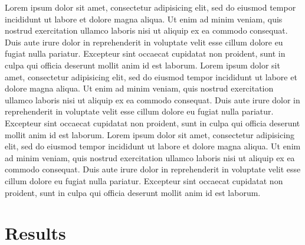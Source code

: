 \documentclass[a0,landscape]{a0poster}
\begin{document}
\begin{multicols}{3}
Lorem ipsum dolor sit amet, consectetur adipisicing elit, sed do eiusmod
tempor incididunt ut labore et dolore magna aliqua. Ut enim ad minim veniam,
quis nostrud exercitation ullamco laboris nisi ut aliquip ex ea commodo
consequat. Duis aute irure dolor in reprehenderit in voluptate velit esse
cillum dolore eu fugiat nulla pariatur. Excepteur sint occaecat cupidatat non
proident, sunt in culpa qui officia deserunt mollit anim id est laborum.
Lorem ipsum dolor sit amet, consectetur adipisicing elit, sed do eiusmod
tempor incididunt ut labore et dolore magna aliqua. Ut enim ad minim veniam,
quis nostrud exercitation ullamco laboris nisi ut aliquip ex ea commodo
consequat. Duis aute irure dolor in reprehenderit in voluptate velit esse
cillum dolore eu fugiat nulla pariatur. Excepteur sint occaecat cupidatat non
proident, sunt in culpa qui officia deserunt mollit anim id est laborum.
Lorem ipsum dolor sit amet, consectetur adipisicing elit, sed do eiusmod
tempor incididunt ut labore et dolore magna aliqua. Ut enim ad minim veniam,
quis nostrud exercitation ullamco laboris nisi ut aliquip ex ea commodo
consequat. Duis aute irure dolor in reprehenderit in voluptate velit esse
cillum dolore eu fugiat nulla pariatur. Excepteur sint occaecat cupidatat non
proident, sunt in culpa qui officia deserunt mollit anim id est laborum.

% 



\color{Black}
\section*{Results}







\end{multicols}
\end{document}
